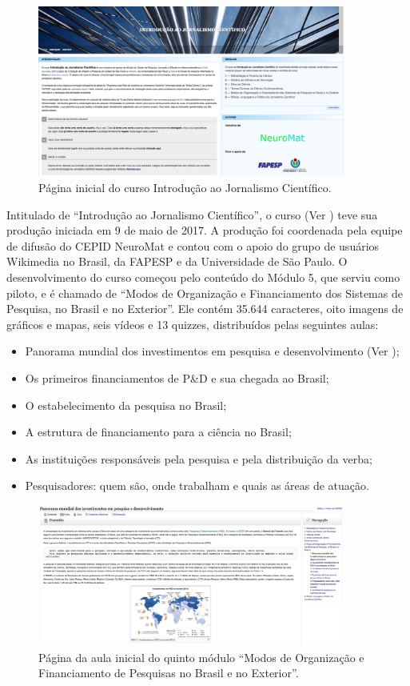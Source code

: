 \documentclass{textolivre}
\begin{document}
\begin{figure}[htbp]
\centering
\includegraphics[width=0.9\textwidth]{fig01.png}
\caption{Página inicial do curso Introdução ao Jornalismo Científico.}
\label{fig01}
\end{figure}

Intitulado de “Introdução ao Jornalismo Científico”, o curso (Ver ) teve sua produção iniciada em 9 de maio de 2017. A produção foi coordenada pela equipe de difusão do CEPID NeuroMat e contou com o apoio do grupo de usuários Wikimedia no Brasil, da FAPESP e da Universidade de São Paulo. O desenvolvimento do curso começou pelo conteúdo do Módulo 5, que serviu como piloto, e é chamado de “Modos de Organização e Financiamento dos Sistemas de Pesquisa, no Brasil e no Exterior”. Ele contém 35.644 caracteres, oito imagens de gráficos e mapas, seis vídeos e 13 quizzes, distribuídos pelas seguintes aulas:

\begin{itemize}
\item Panorama mundial dos investimentos em pesquisa e desenvolvimento (Ver );
\item Os primeiros financiamentos de P\&D e sua chegada ao Brasil;
\item O estabelecimento da pesquisa no Brasil;
\item A estrutura de financiamento para a ciência no Brasil;
\item As instituições responsáveis pela pesquisa e pela distribuição da verba;
\item Pesquisadores: quem são, onde trabalham e quais as áreas de atuação.
\end{itemize}

\begin{figure}[htbp]
\centering
\includegraphics[width=0.9\textwidth]{fig02.png}
\caption{Página da aula inicial do quinto módulo “Modos de Organização e Financiamento de Pesquisas no Brasil e no Exterior”.}
\label{fig02}
\end{figure}
\end{document}

